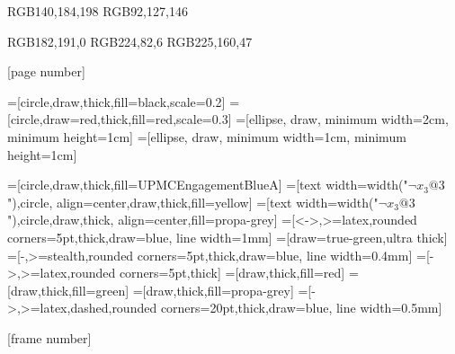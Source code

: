 

\definecolor{UPMCEngagementBlueA} {RGB}{140,184,198}
\definecolor{UPMCEngagementBlueB} {RGB}{92,127,146}

\definecolor{UPMCCorporateGreen} {RGB}{182,191,0}
\definecolor{UPMCExcellenceOrangeA} {RGB}{224,82,6}
\definecolor{UPMCExcellenceOrangeB} {RGB}{225,160,47}

 {
  [page number]{}
  \beamertemplatenavigationsymbolsempty
}


=[circle,draw,thick,fill=black,scale=0.2]
=[circle,draw=red,thick,fill=red,scale=0.3]
=[ellipse, draw, minimum width=2cm, minimum height=1cm]
=[ellipse, draw, minimum width=1cm, minimum height=1cm]

=[circle,draw,thick,fill=UPMCEngagementBlueA]
=[text width={width("$\neg x_3@3$")},circle,
align=center,draw,thick,fill=yellow]
=[text width={width("$\neg x_3@3$")},circle,draw,thick,
align=center,fill=propa-grey]
=[<->,>=latex,rounded corners=5pt,thick,draw=blue, line width=1mm]
=[draw=true-green,ultra thick]
=[-,>=stealth,rounded corners=5pt,thick,draw=blue, line width=0.4mm]
=[->,>=latex,rounded corners=5pt,thick]
=[draw,thick,fill=red]
=[draw,thick,fill=green]
=[draw,thick,fill=propa-grey]
=[->,>=latex,dashed,rounded corners=20pt,thick,draw=blue, line width=0.5mm]

[frame number]{}

\def\SAT{\textcolor{green}{\texttt{SAT}}}
\def\UNSAT{\textcolor{red}{\texttt{UNSAT}}}

\def\true{\textcolor{green}{\texttt{true}}}
\def\false{\textcolor{red}{\texttt{false}}}

\def\ok{\textcolor{green}{\cmark}}
\def\ko{\textcolor{red}{\xmark}}




